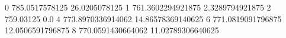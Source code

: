 0 785.0517578125 26.0205078125
1 761.3602294921875 2.3289794921875
2 759.03125 0.0
4 773.8970336914062 14.86578369140625
6 771.0819091796875 12.0506591796875
8 770.0591430664062 11.02789306640625
